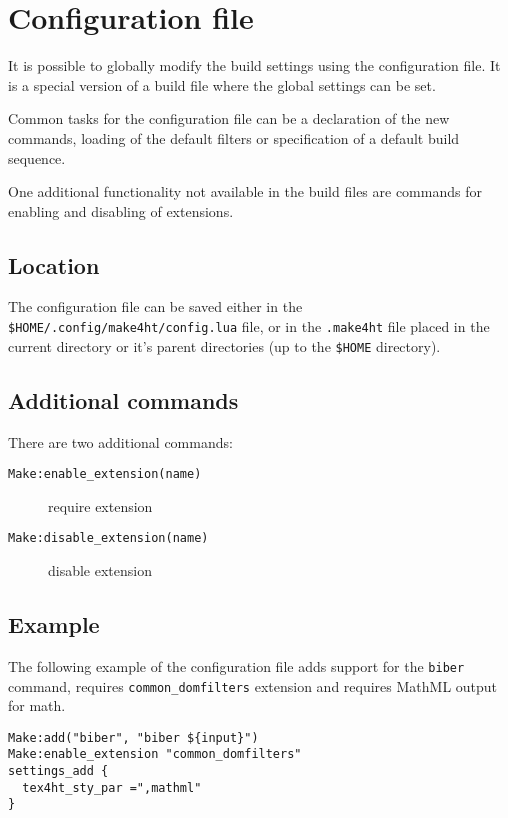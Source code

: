 \hypertarget{configfile}{%
\section{Configuration file}\label{configfile}}

It is possible to globally modify the build settings using the
configuration file. It is a special version of a build file where the
global settings can be set.

Common tasks for the configuration file can be a declaration of the new
commands, loading of the default filters or specification of a default
build sequence.

One additional functionality not available in the build files are
commands for enabling and disabling of extensions.

\hypertarget{location}{%
\subsection{Location}\label{location}}

The configuration file can be saved either in the
\texttt{\$HOME/.config/make4ht/config.lua} file, or in the
\texttt{.make4ht} file placed in the current directory or it's parent
directories (up to the \texttt{\$HOME} directory).

\hypertarget{additional-commands}{%
\subsection{Additional commands}\label{additional-commands}}

There are two additional commands:

\begin{description}
\item[\texttt{Make:enable\_extension(name)}]
require extension
\item[\texttt{Make:disable\_extension(name)}]
disable extension
\end{description}

\hypertarget{example}{%
\subsection{Example}\label{example}}

The following example of the configuration file adds support for the
\texttt{biber} command, requires \texttt{common\_domfilters} extension
and requires MathML output for math.

\begin{verbatim}
Make:add("biber", "biber ${input}")
Make:enable_extension "common_domfilters"
settings_add {
  tex4ht_sty_par =",mathml"
}
\end{verbatim}

